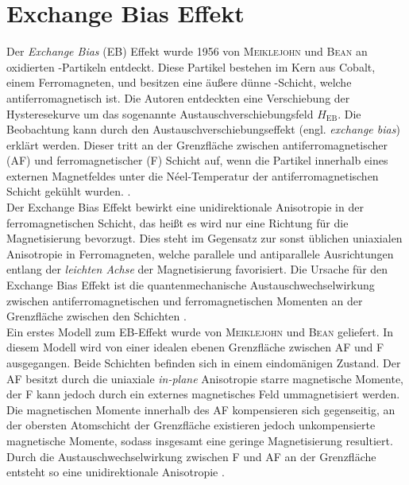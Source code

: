\documentclass[page,pdftex,12pt,a4paper,twoside,openright]{scrbook}
\begin{document}
\section{Exchange Bias Effekt \label{sec-EB}}
\label{sec:org85748ff}
Der \emph{Exchange Bias} (EB) Effekt  wurde 1956 von \textsc{Meiklejohn} und \textsc{Bean} an oxidierten -Partikeln entdeckt. Diese Partikel bestehen im Kern aus Cobalt, einem Ferromagneten, und besitzen eine äußere dünne -Schicht, welche antiferromagnetisch ist. Die Autoren entdeckten eine Verschiebung der Hysteresekurve um das sogenannte Austauschverschiebungsfeld \(H_\mathrm{EB}\). Die Beobachtung kann durch den Austauschverschiebungseffekt (engl. \emph{exchange bias}) erklärt werden. Dieser tritt an der Grenzfläche zwischen antiferromagnetischer (AF) und ferromagnetischer (F) Schicht auf, wenn die Partikel innerhalb eines externen Magnetfeldes unter die Néel-Temperatur der antiferromagnetischen Schicht gekühlt wurden. \cite{meiklejohn_new_1957}.\\


Der Exchange Bias Effekt bewirkt eine unidirektionale Anisotropie in der ferromagnetischen Schicht, das heißt es wird nur eine Richtung für die Magnetisierung bevorzugt. Dies steht im Gegensatz zur sonst üblichen uniaxialen Anisotropie in Ferromagneten, welche parallele und antiparallele Ausrichtungen entlang der \emph{leichten Achse} der Magnetisierung favorisiert. Die Ursache für den Exchange Bias Effekt ist die quantenmechanische Austauschwechselwirkung zwischen antiferromagnetischen und ferromagnetischen Momenten an der Grenzfläche zwischen den Schichten \cite{stohr_magnetism_2006}.\\

Ein erstes Modell zum EB-Effekt wurde von \textsc{Meiklejohn} und \textsc{Bean} geliefert. In diesem Modell wird von einer idealen ebenen Grenzfläche zwischen AF und F ausgegangen. Beide Schichten befinden sich in einem eindomänigen Zustand. Der AF besitzt durch die uniaxiale \emph{in-plane} Anisotropie starre magnetische Momente, der F kann jedoch durch ein externes magnetisches Feld ummagnetisiert werden. Die magnetischen Momente innerhalb des AF kompensieren sich gegenseitig, an der obersten Atomschicht der Grenzfläche existieren jedoch unkompensierte magnetische Momente, sodass insgesamt eine geringe Magnetisierung resultiert. Durch die Austauschwechselwirkung zwischen F und AF an der Grenzfläche entsteht so eine unidirektionale Anisotropie \cite{meiklejohn_new_1957}.\\
\end{document}
